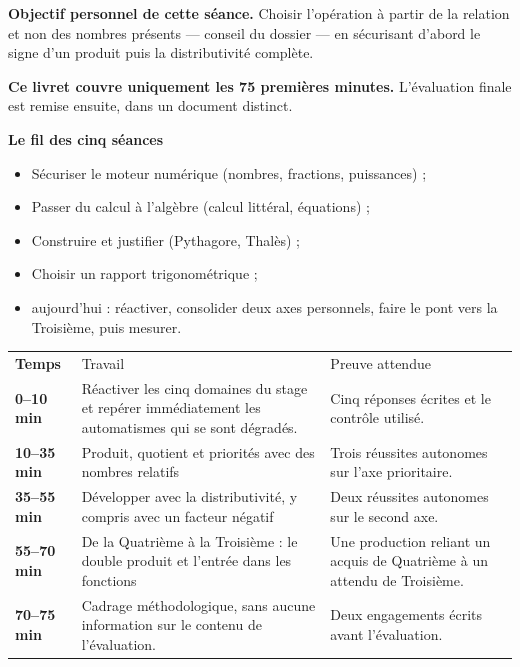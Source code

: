 \documentclass[10pt,a4paper]{article}
\begin{document}
\begin{goalbox}
\textbf{Objectif personnel de cette séance.} Choisir l'opération à partir de la relation et non des nombres présents — conseil du dossier — en sécurisant d'abord le signe d'un produit puis la distributivité complète.
\par\medskip
\textbf{Ce livret couvre uniquement les 75 premières minutes.} L'évaluation finale est remise ensuite, dans un document distinct.
\end{goalbox}
\begin{methodbox}
\textbf{Le fil des cinq séances}
\begin{itemize}[leftmargin=13mm,labelsep=3mm,itemsep=1.5pt]
\item[\textbf{\color{Navy}S1}] Sécuriser le moteur numérique (nombres, fractions, puissances) ;
\item[\textbf{\color{Navy}S2}] Passer du calcul à l'algèbre (calcul littéral, équations) ;
\item[\textbf{\color{Navy}S3}] Construire et justifier (Pythagore, Thalès) ;
\item[\textbf{\color{Navy}S4}] Choisir un rapport trigonométrique ;
\item[\textbf{\color{Navy}S5}] aujourd'hui : réactiver, consolider deux axes personnels, faire le pont vers la Troisième, puis mesurer.
\end{itemize}
\end{methodbox}
\par\noindent\begin{tabularx}{\linewidth}{>{\bfseries}p{20mm} X X}
\rowcolor{Navy}\color{white}Temps & \color{white}Travail & \color{white}Preuve attendue \\
0--10 min & Réactiver les cinq domaines du stage et repérer immédiatement les automatismes qui se sont dégradés. & Cinq réponses écrites et le contrôle utilisé. \\
10--35 min & Produit, quotient et priorités avec des nombres relatifs & Trois réussites autonomes sur l'axe prioritaire. \\
35--55 min & Développer avec la distributivité, y compris avec un facteur négatif & Deux réussites autonomes sur le second axe. \\
55--70 min & De la Quatrième à la Troisième : le double produit et l'entrée dans les fonctions & Une production reliant un acquis de Quatrième à un attendu de Troisième. \\
70--75 min & Cadrage méthodologique, sans aucune information sur le contenu de l'évaluation. & Deux engagements écrits avant l'évaluation. \\
\end{tabularx}
\end{document}
